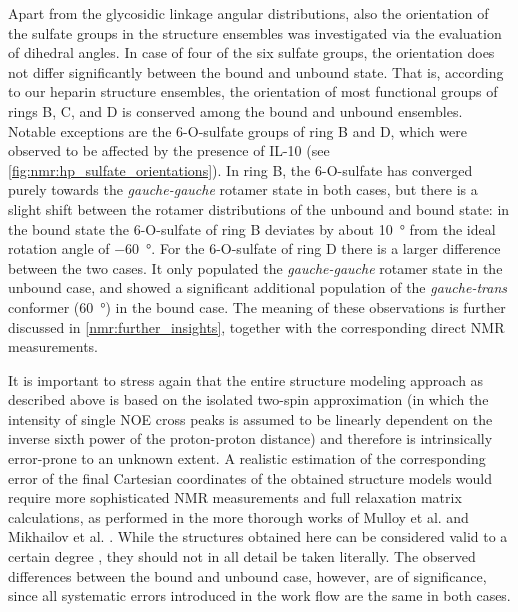 Apart from the glycosidic linkage angular distributions, also the orientation of
the sulfate groups in the structure ensembles was investigated via the
evaluation of dihedral angles. In case of four of the six sulfate groups, the
orientation does not differ significantly between the bound and unbound state.
That is, according to our heparin structure ensembles, the orientation of most
functional groups of rings B, C, and D is conserved among the bound and unbound
ensembles. Notable exceptions are the 6-O-sulfate groups of ring B and D, which
were observed to be affected by the presence of IL-10 (see
\cref{fig:nmr:hp_sulfate_orientations}). In ring B, the 6-O-sulfate has
converged purely towards the \textit{gauche-gauche} rotamer state in both cases,
but there is a slight shift between the rotamer distributions of the unbound and
bound state: in the bound state the 6-O-sulfate of ring B deviates by about
\SI{10}{\degree} from the ideal rotation angle of \SI{-60}{\degree}.
For the 6-O-sulfate of ring D there is a larger difference between the two
cases. It only populated the \textit{gauche-gauche} rotamer state in the unbound
case, and showed a significant additional population of the
\textit{gauche-trans} conformer (\SI{60}{\degree}) in the bound case. The
meaning of these observations is further discussed in
\cref{nmr:further_insights}, together with the corresponding direct NMR
measurements.

%


It is important to stress again that the entire structure modeling approach as
described above is based on the isolated two-spin approximation (in which the
intensity of single NOE cross peaks is assumed to be linearly dependent on the
inverse sixth power of the proton-proton distance) and therefore is
intrinsically error-prone to an unknown extent. A realistic estimation of the
corresponding error of the final Cartesian coordinates of the obtained structure
models would require more sophisticated NMR measurements and full relaxation
matrix calculations, as performed in the more thorough works of Mulloy et al.
\cite{foster_mulloy_1993} and Mikhailov et al. \cite{mikhailov_hp_tetra_1996}.
While the structures obtained here can be considered valid to a certain degree
\cite{jones_noe_2011}, they should not in all detail be taken literally. The
observed differences between the bound and unbound case, however, are of
significance, since all systematic errors introduced in the work flow are the
same in both cases.

